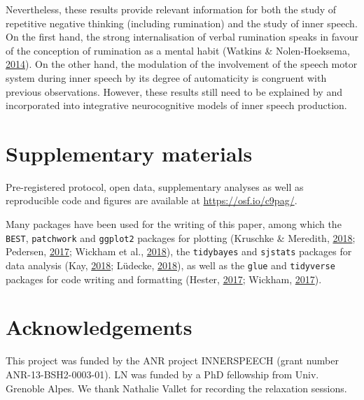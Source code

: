 \documentclass[a4paper,12pt,twoside,onecolumn,openright,final,oldfontcommands]{memoir}
\begin{document}
Nevertheless, these results provide relevant information for both the study of repetitive negative thinking (including rumination) and the study of inner speech. On the first hand, the strong internalisation of verbal rumination speaks in favour of the conception of rumination as a mental habit (Watkins \& Nolen-Hoeksema, \protect\hyperlink{ref-watkins_habit-goal_2014}{2014}). On the other hand, the modulation of the involvement of the speech motor system during inner speech by its degree of automaticity is congruent with previous observations. However, these results still need to be explained by and incorporated into integrative neurocognitive models of inner speech production.

\hypertarget{suppCh4}{%
\section{Supplementary materials}\label{suppCh4}}

Pre-registered protocol, open data, supplementary analyses as well as reproducible code and figures are available at \url{https://osf.io/c9pag/}.

Many packages have been used for the writing of this paper, among which the \texttt{BEST}, \texttt{patchwork} and \texttt{ggplot2} packages for plotting (Kruschke \& Meredith, \protect\hyperlink{ref-R-BEST}{2018}; Pedersen, \protect\hyperlink{ref-R-patchwork}{2017}; Wickham et al., \protect\hyperlink{ref-R-ggplot2}{2018}), the \texttt{tidybayes} and \texttt{sjstats} packages for data analysis (Kay, \protect\hyperlink{ref-R-tidybayes}{2018}; Lüdecke, \protect\hyperlink{ref-R-sjstats}{2018}), as well as the \texttt{glue} and \texttt{tidyverse} packages for code writing and formatting (Hester, \protect\hyperlink{ref-R-glue}{2017}; Wickham, \protect\hyperlink{ref-R-tidyverse}{2017}).

\hypertarget{acknowledgements-1}{%
\section{Acknowledgements}\label{acknowledgements-1}}

This project was funded by the ANR project INNERSPEECH (grant number ANR-13-BSH2-0003-01). LN was funded by a PhD fellowship from Univ. Grenoble Alpes. We thank Nathalie Vallet for recording the relaxation sessions.

\newpage
\end{document}
